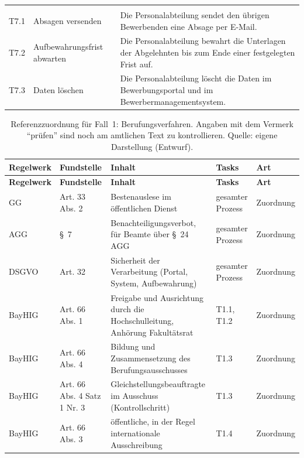 \begin{small}
\begin{longtable}{@{}>{\raggedright\arraybackslash}p{1.0cm}>{\raggedright\arraybackslash}p{3.6cm}>{\raggedright\arraybackslash}p{10.0cm}@{}}
\multicolumn{3}{@{}l}{\textbf{TP7 Absagen und Löschen}} \\
T7.1 & Absagen versenden & Die Personalabteilung sendet den übrigen Bewerbenden eine Absage per E-Mail. \\
T7.2 & Aufbewahrungsfrist abwarten & Die Personalabteilung bewahrt die Unterlagen der Abgelehnten bis zum Ende einer festgelegten Frist auf. \\
T7.3 & Daten löschen & Die Personalabteilung löscht die Daten im Bewerbungsportal und im Bewerbermanagementsystem. \\
\end{longtable}
\end{small}
\begin{small}
\begin{longtable}{@{}>{\raggedright\arraybackslash}p{1.6cm}>{\raggedright\arraybackslash}p{2.6cm}>{\raggedright\arraybackslash}p{5.6cm}>{\raggedright\arraybackslash}p{2.4cm}>{\raggedright\arraybackslash}p{2.0cm}@{}}
\caption[Referenzzuordnung für Fall~1: Berufungsverfahren]{Referenzzuordnung für Fall~1: Berufungsverfahren. Angaben mit dem Vermerk \enquote{prüfen} sind noch am amtlichen Text zu kontrollieren. Quelle: eigene Darstellung (Entwurf).}\label{tab:fall1_referenz}\\
\toprule \textbf{Regelwerk} & \textbf{Fundstelle} & \textbf{Inhalt} & \textbf{Tasks} & \textbf{Art} \\ \midrule \endfirsthead
\toprule \textbf{Regelwerk} & \textbf{Fundstelle} & \textbf{Inhalt} & \textbf{Tasks} & \textbf{Art} \\ \midrule \endhead
\bottomrule \endfoot
GG & Art. 33 Abs. 2 & Bestenauslese im öffentlichen Dienst & gesamter Prozess & Zuordnung \\
AGG & §~7 & Benachteiligungsverbot, für Beamte über §~24 AGG & gesamter Prozess & Zuordnung \\
DSGVO & Art. 32 & Sicherheit der Verarbeitung (Portal, System, Aufbewahrung) & gesamter Prozess & Zuordnung \\
BayHIG & Art. 66 Abs. 1 & Freigabe und Ausrichtung durch die Hochschulleitung, Anhörung Fakultätsrat & T1.1, T1.2 & Zuordnung \\
BayHIG & Art. 66 Abs. 4 & Bildung und Zusammensetzung des Berufungsausschusses & T1.3 & Zuordnung \\
BayHIG & Art. 66 Abs. 4 Satz 1 Nr. 3 & Gleichstellungsbeauftragte im Ausschuss (Kontrollschritt) & T1.3 & Zuordnung \\
BayHIG & Art. 66 Abs. 3 & öffentliche, in der Regel internationale Ausschreibung & T1.4 & Zuordnung \\

\end{longtable}
\end{small}
